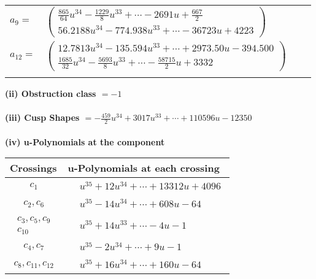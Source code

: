 \documentclass[1p]{elsarticle_modified}
\theoremstyle{definition}
\begin{document}
\begin{tabular}{m{7pt} m{180pt} m{7pt} m{180pt} }
\flushright $a_{9}=$&$\begin{pmatrix}\frac{865}{64} u^{34}-\frac{1229}{8} u^{33}+\cdots-2691 u+\frac{667}{2}\\56.2188 u^{34}-774.938 u^{33}+\cdots-36723 u+4223\end{pmatrix}$ \\
\flushright $a_{12}=$&$\begin{pmatrix}12.7813 u^{34}-135.594 u^{33}+\cdots+2973.50 u-394.500\\\frac{1685}{32} u^{34}-\frac{5693}{8} u^{33}+\cdots-\frac{58715}{2} u+3332\end{pmatrix}$\\&\end{tabular}
\flushleft \textbf{(ii) Obstruction class $= -1$}\\~\\
\flushleft \textbf{(iii) Cusp Shapes $= -\frac{459}{2} u^{34}+3017 u^{33}+\cdots+110596 u-12350$}\\~\\
\newpage\renewcommand{\arraystretch}{1}
\flushleft \textbf{(iv) u-Polynomials at the component}\newline \\
\begin{tabular}{m{50pt}|m{274pt}}
Crossings & \hspace{64pt}u-Polynomials at each crossing \\
\hline $$\begin{aligned}c_{1}\end{aligned}$$&$\begin{aligned}
&u^{35}+12 u^{34}+\cdots+13312 u+4096
\end{aligned}$\\
\hline $$\begin{aligned}c_{2},c_{6}\end{aligned}$$&$\begin{aligned}
&u^{35}-14 u^{34}+\cdots+608 u-64
\end{aligned}$\\
\hline $$\begin{aligned}c_{3},c_{5},c_{9}\\c_{10}\end{aligned}$$&$\begin{aligned}
&u^{35}+14 u^{33}+\cdots-4 u-1
\end{aligned}$\\
\hline $$\begin{aligned}c_{4},c_{7}\end{aligned}$$&$\begin{aligned}
&u^{35}-2 u^{34}+\cdots+9 u-1
\end{aligned}$\\
\hline $$\begin{aligned}c_{8},c_{11},c_{12}\end{aligned}$$&$\begin{aligned}
&u^{35}+16 u^{34}+\cdots+160 u-64
\end{aligned}$\\
\hline
\end{tabular}\\~\\
\end{document}
